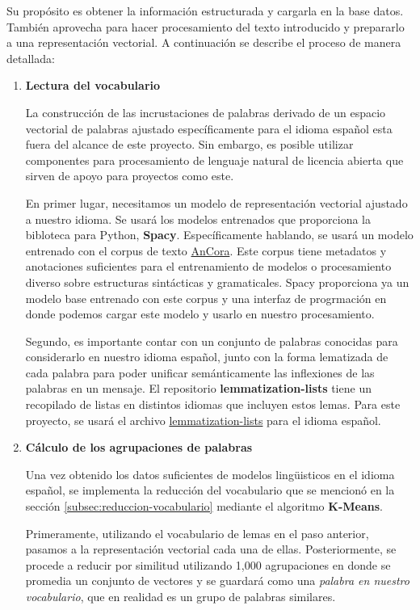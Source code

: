 Su propósito es obtener la información estructurada y cargarla en la base datos. También aprovecha para hacer procesamiento del texto introducido y prepararlo a una representación vectorial. A continuación se describe el proceso de manera detallada:

\begin{enumerate}
    \item \textbf{Lectura del vocabulario}
    
    La construcción de las incrustaciones de palabras derivado de un espacio vectorial de palabras ajustado específicamente para el idioma español esta fuera del alcance de este proyecto. Sin embargo, es posible utilizar componentes para procesamiento de lenguaje natural de licencia abierta que sirven de apoyo para proyectos como este.
    
    En primer lugar, necesitamos un modelo de representación vectorial ajustado a nuestro idioma. Se usará los modelos entrenados que proporciona la bibloteca para Python, \textbf{Spacy}. Específicamente hablando, se usará un modelo entrenado con el corpus de texto \href{https://github.com/UniversalDependencies/UD_Spanish-AnCora}{AnCora}. Este corpus tiene metadatos y anotaciones suficientes para el entrenamiento de modelos o procesamiento diverso sobre estructuras sintácticas y gramaticales. Spacy proporciona ya un modelo base entrenado con este corpus y una interfaz de progrmación en donde podemos cargar este modelo y usarlo en nuestro procesamiento.
    
    Segundo, es importante contar con un conjunto de palabras conocidas para considerarlo en nuestro idioma español, junto con la forma lematizada de cada palabra para poder unificar semánticamente las inflexiones de las palabras en un mensaje. El repositorio \textbf{lemmatization-lists} tiene un recopilado de listas en distintos idiomas que incluyen estos lemas. Para este proyecto, se usará el archivo \href{https://github.com/michmech/lemmatization-lists/blob/master/lemmatization-es.txt}{lemmatization-lists} para el idioma español.
    
    \item \textbf{Cálculo de los agrupaciones de palabras}
    
    Una vez obtenido los datos suficientes de modelos lingüisticos en el idioma español, se implementa la reducción del vocabulario que se mencionó en la sección \ref{subsec:reduccion-vocabulario} mediante el algoritmo \textbf{K-Means}.
    
    Primeramente, utilizando el vocabulario de lemas en el paso anterior, pasamos a la representación vectorial cada una de ellas. Posteriormente, se procede a reducir por similitud utilizando 1,000 agrupaciones en donde se promedia un conjunto de vectores y se guardará como una \textit{palabra en nuestro vocabulario}, que en realidad es un grupo de palabras similares.
    

\end{enumerate}
